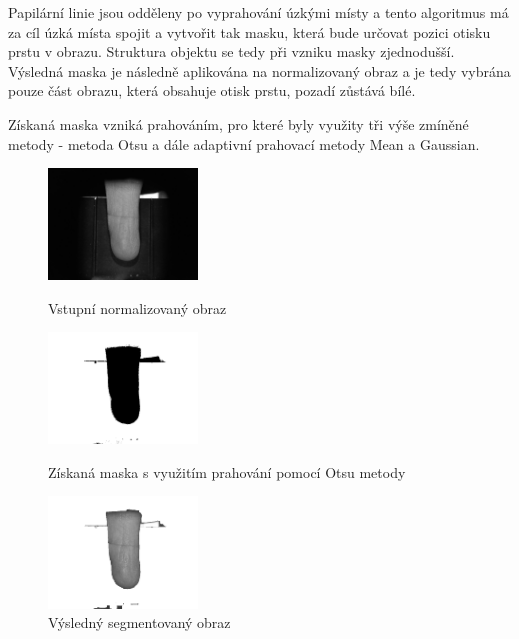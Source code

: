 Papilární linie jsou odděleny po vyprahování úzkými místy a tento algoritmus má za cíl úzká místa spojit a vytvořit tak masku, která bude určovat pozici otisku prstu v obrazu. Struktura objektu se tedy při vzniku masky zjednodušší. Výsledná maska je následně aplikována na normalizovaný obraz a je tedy vybrána pouze část obrazu, která obsahuje otisk prstu, pozadí zůstává bílé.

Získaná maska vzniká prahováním, pro které byly využity tři výše zmíněné metody - metoda Otsu a dále adaptivní prahovací metody Mean a Gaussian.

\begin{figure}[!htbp]
  \begin{minipage}[b]{0.3\linewidth}
    \centering
    \includegraphics[width=150px]{obrazky-figures/live104norm.png}
    \caption{Vstupní normalizovaný obraz}
  \end{minipage}
  \hspace{0.3cm}
  \begin{minipage}[b]{0.3\linewidth}
    \centering
    \includegraphics[width=150px]{obrazky-figures/live104mask.png}
    \caption{Získaná maska s využitím prahování pomocí Otsu metody}
  \end{minipage}
  \hspace{0.3cm}
    \begin{minipage}[b]{0.3\linewidth}
    \centering
    \includegraphics[width=150px]{obrazky-figures/live104segotsu.png}
    \caption{Výsledný segmentovaný obraz}
  \end{minipage}
\end{figure}


